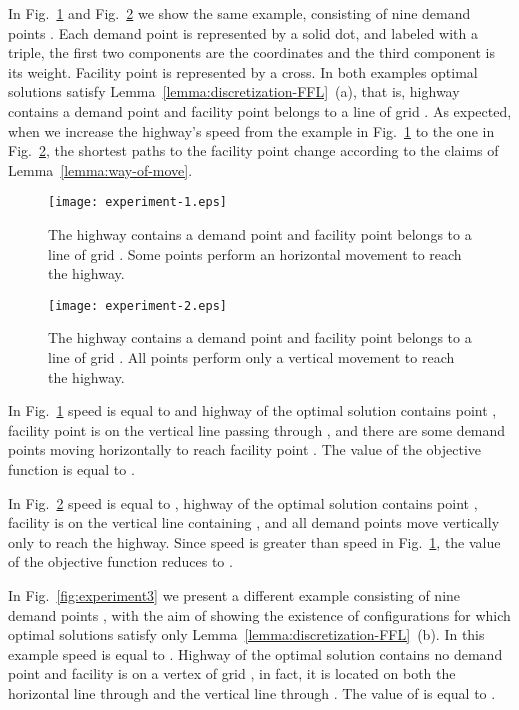 \documentclass[11pt,a4paper,oneside,onecolumn]{article}
\begin{document}
In Fig.~\ref{fig:experiment1} and Fig.~\ref{fig:experiment2} we show
the same example, consisting of nine demand points
. Each demand point is represented by a solid
dot, and labeled with a triple, the first two components are the
coordinates and the third component is its weight. Facility point
 is represented by a cross. In both examples optimal solutions
satisfy Lemma~\ref{lemma:discretization-FFL}~(a), that is, highway
contains a demand point and facility point belongs to a line of grid
. As expected, when we increase the highway's speed from the
example in Fig.~\ref{fig:experiment1} to the one in
Fig.~\ref{fig:experiment2}, the shortest paths to the facility
point change according to the claims of
Lemma~\ref{lemma:way-of-move}.
\begin{figure}[h]
  \centering
  \texttt{[image: experiment-1.eps]}
  \caption{\small{The highway contains a demand point and facility point belongs
  to a line of grid . Some points perform an horizontal movement to reach the
highway.}}
  \label{fig:experiment1}
\end{figure}

\begin{figure}[h]
  \centering
  \texttt{[image: experiment-2.eps]}
  \caption{\small{The highway contains a demand point and facility point belongs
  to a line of grid . All points perform only a vertical movement to reach the
highway.}}
  \label{fig:experiment2}
\end{figure}

In Fig.~\ref{fig:experiment1} speed  is equal to  and
highway  of the optimal solution contains point , facility
point  is on the vertical line passing through
, and there are some demand points moving horizontally to reach
facility point . The value of the objective function 
is equal to .

In Fig.~\ref{fig:experiment2} speed  is equal to , highway
 of the optimal solution contains point , facility
 is on the vertical line containing , and all
demand points move vertically only to reach the highway. Since speed
is greater than speed in Fig.~\ref{fig:experiment1}, the value of
the objective function  reduces to .

In Fig.~\ref{fig:experiment3} we present a different example
consisting of nine demand points , with the aim of
showing the existence of configurations for which optimal solutions
satisfy only Lemma~\ref{lemma:discretization-FFL}~(b). In this
example speed  is equal to . Highway
 of the optimal solution contains no demand point and facility
 is on a vertex of grid , in fact, it is located on both
the horizontal line through  and the vertical line through
. The value of  is equal to .
\end{document}
